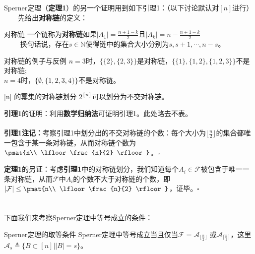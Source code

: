 Sperner定理（\textbf{定理1}）的另一个证明用到如下引理1：（以下讨论默认对$[n]$进行）\\
$\qquad$先给出\textbf{对称链}的定义：

\begin{definition}{对称链}
一个链称为\textbf{对称链}如果$|A_1|=\frac{n+1-k}{2}$且$|A_k|=n-\frac{n+1-k}{2}$\\
$\qquad$
换句话说，存在$s\in \mathbb{N}$使得链中的集合大小分别为$s,s+1,\cdots,n-s$。
\end{definition}

\begin{example}{对称链的例子与反例}
$n=3$时，$\{\{2\},\{2,3\}\}$是对称链，$\{\{1\},\{1,2\},\{1,2,3\}\}$不是对称链;\\
$n=4$时，$\{\emptyset,\{1,2,3,4\}\}$不是对称链。
\end{example}


\begin{lemma}{[n] 的幂集的对称链划分}
$2^{[n]}$可以划分为不交对称链。
\end{lemma}

\textbf{引理1}的证明：利用\textbf{数学归纳法}可证明引理1。此处略去不表。\\\\
\textbf{引理1注记：}考察引理1中划分出的不交对称链的个数：每个大小为$\lfloor\frac{n}{2}\rfloor$的集合都唯一包含于某一条对称链，从而对称链个数为$\pmat{n\\ \lfloor\frac{n}{2} \rfloor}$。$\square$

\textbf{定理1}的另证：考虑\textbf{引理1}中的对称链划分，我们知道每个$A_i\in \mathcal{F}$被包含于唯一一条对称链，从而$\mathcal{F}$中$A_i$的个数不大于对称链的个数，即$|\mathcal{F}|\leq \pmat{n\\ \lfloor\frac{n}{2} \rfloor}$，证毕。$\square$\\
\\
\\
下面我们来考察Sperner定理中等号成立的条件：
\begin{theorem}{Sperner定理的取等条件}
Sperner定理中等号成立当且仅当$\mathcal{F}=\mathcal{A}_{\lfloor\frac{n}{2} \rfloor}$ 或$ \mathcal{A}_{\lceil\frac{n}{2} \rceil}$，这里$\mathcal{A}_s\triangleq\{B\subset[n]||B|=s\}$。
\end{theorem}

